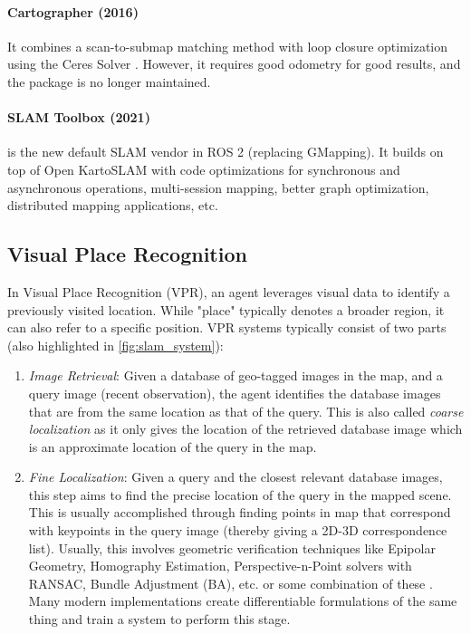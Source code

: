 \paragraph{Cartographer (2016) \cite{Hess2016RealtimeLC}} It combines
a scan-to-submap matching method with loop closure optimization using
the Ceres Solver \cite{Agarwal2023CeresS}. However, it requires good
odometry for good results, and the package is no longer maintained.

\paragraph{SLAM Toolbox (2021) \cite{Macenski2021SLAMTS}} is the new
default SLAM vendor in ROS 2 (replacing GMapping). It builds on top of
Open KartoSLAM \cite{Konolige2010EfficientSP} with code optimizations
for synchronous and asynchronous operations, multi-session mapping, 
better graph optimization, distributed mapping applications, etc.


\subsection{Visual Place Recognition}
\label{subsec:intro-vpr}

In Visual Place Recognition (VPR), an agent leverages visual data to
identify a previously visited location. While "place" typically
denotes a broader region, it can also refer to a specific position.
VPR systems typically consist of two parts (also highlighted in
\cref{fig:slam_system}):

\begin{enumerate}
    \item \emph{Image Retrieval}: Given a database of geo-tagged
        images in the map, and a query image (recent observation), the
        agent identifies the database images that are from the same
        location as that of the query. This is also called
        \emph{coarse localization} as it only gives the location of
        the retrieved database image which is an approximate location
        of the query in the map.
    \item \emph{Fine Localization}: Given a query and the closest
        relevant database images, this step aims to find the precise
        location of the query in the mapped scene. This is usually
        accomplished through finding points in map that correspond
        with keypoints in the query image (thereby giving a 2D-3D
        correspondence list). Usually, this involves geometric
        verification techniques like Epipolar Geometry, Homography
        Estimation, Perspective-n-Point solvers with RANSAC, Bundle
        Adjustment (BA), etc. or some combination of these
        \cite{Hartley2001MultipleVG}. Many modern implementations
        create differentiable formulations of the same thing and
        train a system to perform this stage.
\end{enumerate}

